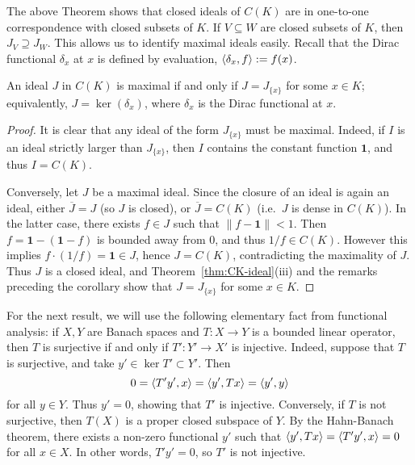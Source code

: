 The above Theorem shows that closed ideals of $C(K)$ are in one-to-one correspondence with closed subsets of $K$. If $V \subseteq W$ are closed subsets of $K$, then $J_V \supseteq J_W$. This allows us to identify maximal ideals easily. Recall that the Dirac functional $\delta_x$ at $x$ is defined by evaluation, $\braket{\delta_x, f} := f(x)$.
\begin{corollary}
	An ideal $J$ in $C(K)$ is maximal if and only if $J = J_{\{x\}}$ for some $x\in K$; equivalently, $J = \ker(\delta_x)$, where $\delta_x$ is the Dirac functional at $x$.
\end{corollary}

\begin{proof}
	It is clear that any ideal of the form $J_{\{x\}}$ must be maximal. Indeed, if $I$ is an ideal strictly larger than $J_{\{x\}}$, then $I$ contains the constant function $\mathbf{1}$, and thus $I = C(K)$.
	
	Conversely, let $J$ be a maximal ideal. Since the closure of an ideal is again an ideal, either $\overline{J} = J$ (so $J$ is closed), or $\overline{J} = C(K)$ (i.e.\ $J$ is dense in $C(K)$). In the latter case, there exists $f \in J$ such that $\|f-\mathbf{1}\| < 1$. Then $f = \mathbf{1}-(\mathbf{1}-f)$ is bounded away from 0, and thus $1/f \in C(K)$. However this implies $f \cdot (1/f) = \mathbf{1} \in J$, hence $J = C(K)$, contradicting the maximality of $J$. Thus $J$ is a closed ideal, and Theorem~\ref{thm:CK-ideal}(iii) and the remarks preceding the corollary show that $J = J_{\{x\}}$ for some $x\in K$.
\end{proof}

For the next result, we will use the following elementary fact from functional analysis: if $X,Y$ are Banach spaces and $T:X\to Y$ is a bounded linear operator, then $T$ is surjective if and only if $T':Y'\to X'$ is injective. Indeed, suppose that $T$ is surjective, and take $y'\in \ker T' \subset Y'$. Then
\begin{equation*}
	0 = \braket{T'y',x} = \braket{y',Tx} = \braket{y',y}
\end{equation*}
for all $y\in Y$. Thus $y'=0$, showing that $T'$ is injective. Conversely, if $T$ is not surjective, then $T(X)$ is a proper closed subspace of $Y$. By the Hahn-Banach theorem, there exists a non-zero functional $y'$ such that $\braket{y',Tx} = \braket{T'y',x}=0$ for all $x\in X$. In other words, $T'y'=0$, so $T'$ is not injective.


